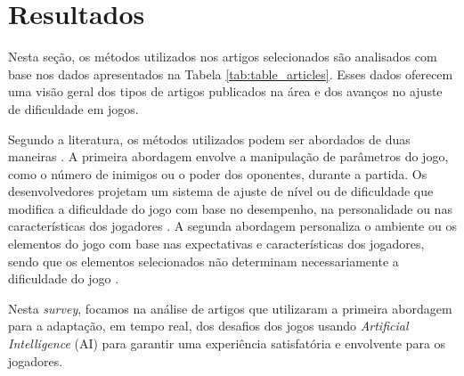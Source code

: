 \section{Resultados} \label{sec:results}
    Nesta seção, os métodos utilizados nos artigos
    selecionados são analisados com base nos dados 
    apresentados na Tabela \ref{tab:table_articles}.
    Esses dados oferecem uma visão geral dos tipos de 
    artigos publicados na área e dos avanços no ajuste de
    dificuldade em jogos.

    Segundo a literatura, os métodos utilizados podem 
    ser abordados de duas maneiras 
    \cite{lopes2011adaptivity}.
    A primeira abordagem envolve a manipulação de parâmetros 
    do jogo, como o número de inimigos ou o poder dos 
    oponentes, durante a partida. Os desenvolvedores 
    projetam um sistema de ajuste de nível ou de dificuldade
    que modifica a dificuldade do jogo com base no 
    desempenho, na personalidade ou nas características dos 
    jogadores \cite{lara2018induction}.
    A segunda abordagem personaliza o ambiente ou os 
    elementos do jogo com base nas expectativas e 
    características dos jogadores, sendo que os elementos 
    selecionados não determinam necessariamente a 
    dificuldade do jogo \cite{lavoue2018adaptive}.

    Nesta \textit{survey}, focamos na análise de artigos 
    que utilizaram a primeira abordagem para a adaptação,
    em tempo real, dos desafios dos jogos usando 
    \textit{Artificial Intelligence} (AI) para 
    garantir uma experiência satisfatória e envolvente 
    para os jogadores.

    

    







